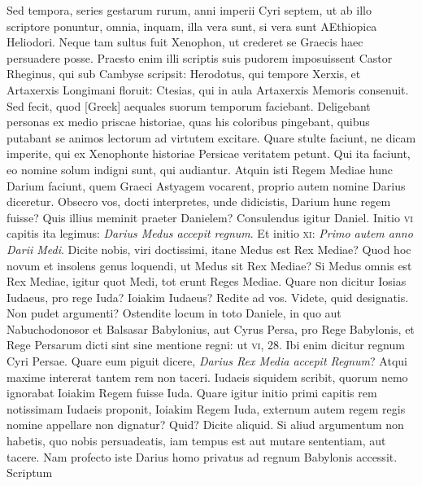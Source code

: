 Sed tempora,
series gestarum rurum, anni imperii Cyri septem, ut ab illo
scriptore ponuntur, omnia, inquam, illa vera sunt, si vera sunt AEthiopica
Heliodori.
Neque tam sultus fuit Xenophon, ut crederet se
Graecis haec persuadere posse.
Praesto enim illi scriptis suis pudorem
imposuissent Castor Rheginus, qui sub Cambyse scripsit: Herodotus,
qui tempore Xerxis, et Artaxerxis Longimani floruit: Ctesias, qui in
aula Artaxerxis Memoris consenuit.
Sed fecit, quod \textgreek{[Greek]} aequales
suorum temporum faciebant.
Deligebant personas ex medio priscae
historiae, quas his coloribus pingebant, quibus putabant se animos
lectorum ad virtutem excitare.
Quare stulte faciunt, ne dicam
imperite, qui ex Xenophonte historiae Persicae veritatem petunt.
Qui ita faciunt, eo nomine solum indigni sunt, qui audiantur.
Atquin isti Regem Mediae hunc Darium faciunt, quem Graeci Astyagem
vocarent, proprio autem nomine Darius diceretur.
Obsecro
vos, docti interpretes, unde didicistis, Darium hunc regem fuisse?
Quis illius meminit praeter Danielem?
Consulendus igitur Daniel.
Initio \textsc{vi} capitis ita legimus:
 \textit{Darius Medus accepit regnum}.
Et initio \textsc{xi}: \textit{Primo autem anno Darii Medi}.
Dicite nobis, viri doctissimi, itane
Medus est Rex Mediae?
Quod hoc novum et insolens genus loquendi,
ut Medus sit Rex Mediae?
Si Medus omnis est Rex Mediae,
igitur quot Medi, tot erunt Reges Mediae.
Quare non dicitur Iosias
Iudaeus, pro rege Iuda?
Ioiakim Iudaeus?
Redite ad vos.
Videte, quid
designatis.
Non pudet argumenti?
Ostendite locum in toto Daniele,
in quo aut Nabuchodonosor et Balsasar Babylonius, aut Cyrus
Persa, pro Rege Babylonis, et Rege Persarum dicti sint sine mentione
regni: ut \textsc{vi}, 28.
Ibi enim dicitur regnum Cyri Persae.
Quare eum piguit dicere, \textit{Darius Rex Media accepit Regnum}?
Atqui maxime intererat
tantem rem non taceri.
Iudaeis siquidem scribit, quorum nemo
ignorabat Ioiakim Regem fuisse Iuda.
Quare igitur initio primi
capitis rem notissimam Iudaeis proponit, Ioiakim Regem Iuda, externum
autem regem regis nomine appellare non dignatur?
Quid?
Dicite aliquid.
Si aliud argumentum non habetis, quo nobis persuadeatis,
iam tempus est aut mutare sententiam, aut tacere.
Nam profecto iste Darius homo privatus ad regnum Babylonis accessit.
Scriptum
